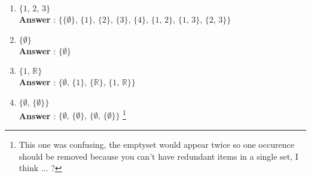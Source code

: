 \documentclass[a4paper,11pt]{article}
\begin{document}
\begin{enumerate}
  \begin{enumerate}
  \item $ \lbrace 1 \text{, } 2 \text{, } 3 \rbrace$ \\
  \textbf{Answer} : $ \lbrace 
   \lbrace \emptyset \rbrace \text{, } 
   \lbrace 1 \rbrace \text{, } 
   \lbrace 2 \rbrace \text{, } 
   \lbrace 3 \rbrace \text{, } 
   \lbrace 4 \rbrace \text{, } 
   \lbrace 1 \text{, } 2 \rbrace \text{, } 
   \lbrace 1 \text{, } 3 \rbrace \text{, } 
   \lbrace 2 \text{, } 3 \rbrace
   \rbrace$
   \item $ \lbrace \emptyset \rbrace$ \\
   \textbf{Answer} : $ \lbrace\emptyset \rbrace$
   \item $ \lbrace 1 \text{, } \mathbb{R} \rbrace$ \\
   \textbf{Answer} : $ \lbrace
   \emptyset \text{, }
   \lbrace 1  \rbrace \text{, } 
   \lbrace \mathbb{R}  \rbrace \text{, }
   \lbrace 1 \text{, } \mathbb{R} \rbrace 
   \rbrace$
   \item $ \lbrace \emptyset \text{, } \lbrace \emptyset \rbrace \rbrace$ \\
   \textbf{Answer} : $ \lbrace
   \emptyset \text{, } 
   \lbrace \emptyset \rbrace \text{, } 
   \lbrace \emptyset \text{, } \lbrace \emptyset \rbrace
   \rbrace$ \footnote{This one was confusing, the emptyset would appear twice so one occurence should be removed because you can't have redundant items in a single set, I think $\ldots$ ?}
  \end{enumerate}

\end{enumerate}
\end{document}
